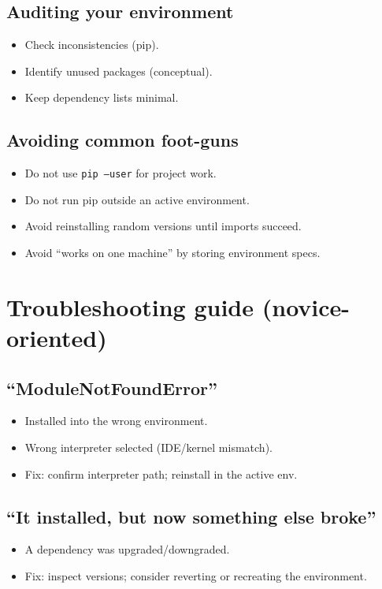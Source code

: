 \subsection{Auditing your environment}
\begin{itemize}
\item Check inconsistencies (pip).
\item Identify unused packages (conceptual).
\item Keep dependency lists minimal.
\end{itemize}

\subsection{Avoiding common foot-guns}
\begin{itemize}
\item Do not use \texttt{pip --user} for project work.
\item Do not run pip outside an active environment.
\item Avoid reinstalling random versions until imports succeed.
\item Avoid ``works on one machine'' by storing environment specs.
\end{itemize}

\section{Troubleshooting guide (novice-oriented)}
\subsection{``ModuleNotFoundError''}
\begin{itemize}
\item Installed into the wrong environment.
\item Wrong interpreter selected (IDE/kernel mismatch).
\item Fix: confirm interpreter path; reinstall in the active env.
\end{itemize}

\subsection{``It installed, but now something else broke''}
\begin{itemize}
\item A dependency was upgraded/downgraded.
\item Fix: inspect versions; consider reverting or recreating the environment.
\end{itemize}

